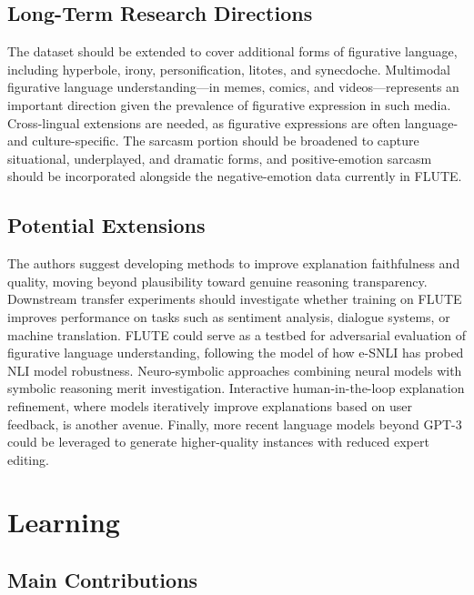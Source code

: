 \documentclass[12pt]{article}
\begin{document}
\subsection{Long-Term Research Directions}

The dataset should be extended to cover additional forms of figurative language, including hyperbole, irony, personification, litotes, and synecdoche. Multimodal figurative language understanding---in memes, comics, and videos---represents an important direction given the prevalence of figurative expression in such media. Cross-lingual extensions are needed, as figurative expressions are often language- and culture-specific. The sarcasm portion should be broadened to capture situational, underplayed, and dramatic forms, and positive-emotion sarcasm should be incorporated alongside the negative-emotion data currently in FLUTE.

\subsection{Potential Extensions}

The authors suggest developing methods to improve explanation faithfulness and quality, moving beyond plausibility toward genuine reasoning transparency. Downstream transfer experiments should investigate whether training on FLUTE improves performance on tasks such as sentiment analysis, dialogue systems, or machine translation. FLUTE could serve as a testbed for adversarial evaluation of figurative language understanding, following the model of how e-SNLI has probed NLI model robustness. Neuro-symbolic approaches combining neural models with symbolic reasoning merit investigation. Interactive human-in-the-loop explanation refinement, where models iteratively improve explanations based on user feedback, is another avenue. Finally, more recent language models beyond GPT-3 could be leveraged to generate higher-quality instances with reduced expert editing.

\section{Learning}

\subsection{Main Contributions}
\end{document}
